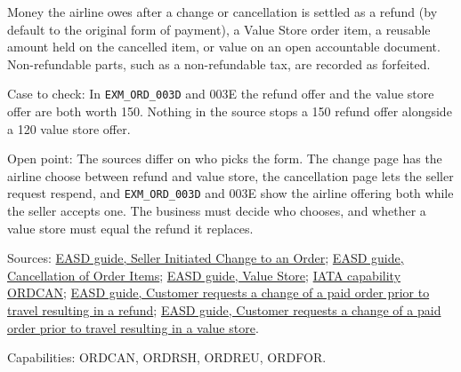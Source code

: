 \begin{definition}
  \label{def:change-cancellation-owed-settlement}
  \notready
  Money the airline owes after a change or cancellation is settled as a
  refund (by default to the original form of payment), a Value Store order
  item, a reusable amount held on the cancelled item, or value on an open
  accountable document. Non-refundable parts, such as a non-refundable tax,
  are recorded as forfeited.

  Case to check: In \texttt{EXM\_ORD\_003D} and 003E the refund offer and
  the value store offer are both worth 150. Nothing in the source stops a
  150 refund offer alongside a 120 value store offer.

  Open point: The sources differ on who picks the form. The change page has
  the airline choose between refund and value store, the cancellation page
  lets the seller request respend, and \texttt{EXM\_ORD\_003D} and 003E show
  the airline offering both while the seller accepts one. The business must
  decide who chooses, and whether a value store must equal the refund it
  replaces.

  Sources: \href{https://standards.atlassian.net/wiki/spaces/EASD/pages/574554168}{EASD guide, Seller Initiated Change to an Order};
  \href{https://standards.atlassian.net/wiki/spaces/EASD/pages/574783569}{EASD guide, Cancellation of Order Items};
  \href{https://standards.atlassian.net/wiki/spaces/EASD/pages/574554245}{EASD guide, Value Store};
  \href{https://retailing.iata.org/armi/docs/ORDCAN/}{IATA capability ORDCAN};
  \href{https://standards.atlassian.net/wiki/spaces/EASD/pages/842268768}{EASD guide, Customer requests a change of a paid order prior to travel resulting in a refund};
  \href{https://standards.atlassian.net/wiki/spaces/EASD/pages/842268791}{EASD guide, Customer requests a change of a paid order prior to travel resulting in a value store}.

  Capabilities: ORDCAN, ORDRSH, ORDREU, ORDFOR.
\end{definition}

